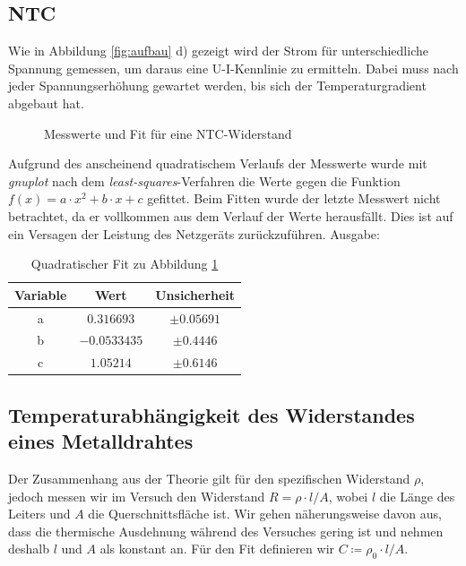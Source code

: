 \subsection{NTC}
Wie in Abbildung \ref{fig:aufbau} d) gezeigt wird der Strom für unterschiedliche Spannung gemessen, um daraus eine U-I-Kennlinie zu ermitteln. Dabei muss nach jeder Spannungserhöhung gewartet werden, bis sich der Temperaturgradient abgebaut hat. 

\begin{figure}[H]
\centering
{}
\caption{Messwerte und Fit für eine NTC-Widerstand}
\label{fig:ntc}
\end{figure}
Aufgrund des anscheinend quadratischem Verlaufs der Messwerte wurde mit \emph{gnuplot} nach dem \emph{least-squares}-Verfahren die Werte gegen die Funktion $f(x)=a\cdot x^2+b\cdot x+c$ gefittet. Beim Fitten wurde der letzte Messwert nicht betrachtet, da er vollkommen aus dem Verlauf der Werte herausfällt. Dies ist auf ein Versagen der Leistung des Netzgeräts zurückzuführen. Ausgabe:
\begin{table}[H]
  \centering
  \begin{tabular}{c | c | c }
    Variable   & Wert & Unsicherheit\\ \hline
    a & $\num{0,316693}$ & $\pm\num{0,05691}$ \\
    b & $\num{-0,0533435}$ & $\pm\num{0,4446}$ \\
    c & $\num{1,05214}$ & $\pm\num{0,6146}$ \\
  \end{tabular}
  \caption{Quadratischer Fit zu Abbildung \ref{fig:ntc}}
  \label{tab:fitntc}
\end{table}
\subsection{Temperaturabhängigkeit des Widerstandes eines Metalldrahtes}
Der Zusammenhang aus der Theorie gilt für den spezifischen Widerstand $\rho$, jedoch messen wir im Versuch den Widerstand $R=\rho\cdot l/A$, wobei $l$ die Länge des Leiters und $A$ die Querschnittsfläche ist. Wir gehen näherungsweise davon aus, dass die thermische Ausdehnung während des Versuches gering ist und nehmen deshalb $l$ und $A$ als konstant an. Für den Fit definieren wir $C\coloneqq \rho_0\cdot l/A$.


